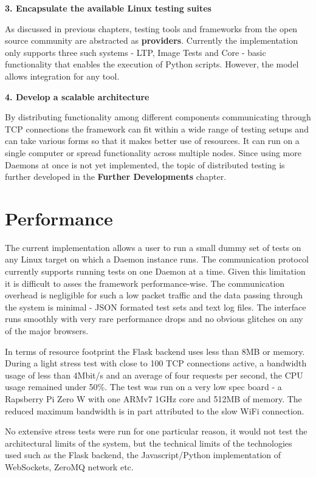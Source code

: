\textbf{3. Encapsulate the available Linux testing suites}

As discussed in previous chapters, testing tools and frameworks from the open source community are abstracted as \textbf{providers}. Currently the implementation only supports three such systems - LTP, Image Tests and Core - basic functionality that enables the execution of Python scripts. However, the model allows integration for any tool.

\textbf{4. Develop a scalable architecture}

By distributing functionality among different components communicating through TCP connections the framework can fit within a wide range of testing setups and can take various forms so that it makes better use of resources. It can run on a single computer or spread functionality across multiple nodes. Since using more Daemons at once is not yet implemented, the topic of distributed testing is further developed in the \textbf{Further Developments} chapter.

\section{Performance}
The current implementation allows a user to run a small dummy set of tests on any Linux target on which a Daemon instance runs. The communication protocol currently supports running tests on one Daemon at a time. Given this limitation it is difficult to asses the framework performance-wise. The communication overhead is negligible for such a low packet traffic and the data passing through the system is minimal - JSON formated test sets and text log files. The interface runs smoothly with very rare performance drops and no obvious glitches on any of the major browsers.

In terms of resource footprint the Flask backend uses less than 8MB or memory. During a light stress test with close to 100 TCP connections active, a bandwidth usage of less than 4Mbit/s and an average of four requests per second, the CPU usage remained under 50\%. The test was run on a very low spec board - a Rapsberry Pi Zero W with one ARMv7 1GHz core and 512MB of memory. The reduced maximum bandwidth is in part attributed to the slow WiFi connection.

No extensive stress tests were run for one particular reason, it would not test the architectural limits of the system, but the technical limits of the technologies used such as the Flask backend, the Javascript/Python implementation of WebSockets, ZeroMQ network etc.


